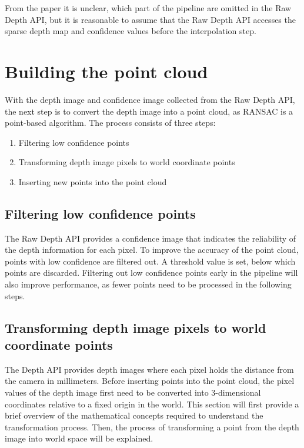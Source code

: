 From the paper it is unclear, which part of the pipeline are omitted in the Raw Depth API,
but it is reasonable to assume that the Raw Depth API accesses the sparse depth map and confidence values before the interpolation step.


\section{Building the point cloud}\label{sec:building-the-point-cloud}
With the depth image and confidence image collected from the Raw Depth API,
the next step is to convert the depth image into a point cloud, as RANSAC is a point-based algorithm.
The process consists of three steps:
\begin{enumerate}
    \item Filtering low confidence points
    \item Transforming depth image pixels to world coordinate points
    \item Inserting new points into the point cloud
\end{enumerate}

\subsection{Filtering low confidence points}
The Raw Depth API provides a confidence image that indicates the reliability of the depth information for each pixel.
To improve the accuracy of the point cloud, points with low confidence are filtered out.
A threshold value is set, below which points are discarded.
Filtering out low confidence points early in the pipeline will also improve performance,
as fewer points need to be processed in the following steps.

\subsection{Transforming depth image pixels to world coordinate points}
The Depth API provides depth images where each pixel holds the distance
from the camera in millimeters.
Before inserting points into the point cloud, the pixel values of the depth image
first need to be converted into 3-dimensional coordinates relative to a fixed origin in the world.
This section will first provide a brief overview of the mathematical concepts required to understand the transformation process.
Then, the process of transforming a point from the depth image into world space will be explained.


